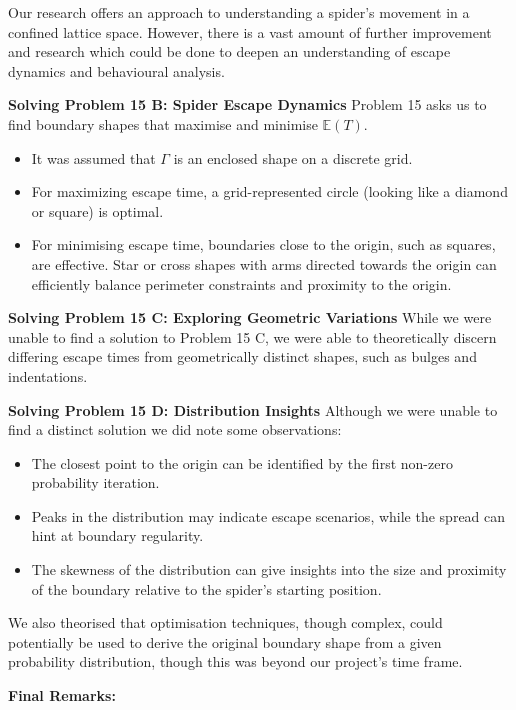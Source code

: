 \documentclass[12pt,a4paper]{article}
\begin{document}
Our research offers an approach to understanding a spider's movement in a confined lattice space. However, there is a vast amount of further improvement and research which could be done to deepen an understanding of escape dynamics and behavioural analysis.

\textbf{Solving Problem 15 B: Spider Escape Dynamics}
Problem 15 asks us to find boundary shapes that maximise and minimise $\mathbb{E}(T)$. 

\begin{itemize}
    \item It was assumed that \(\Gamma\) is an enclosed shape on a discrete grid.
    \item For maximizing escape time, a grid-represented circle (looking like a diamond or square) is optimal.
    \item For minimising escape time, boundaries close to the origin, such as squares, are effective. Star or cross shapes with arms directed towards the origin can efficiently balance perimeter constraints and proximity to the origin.
\end{itemize}

\textbf{Solving Problem 15 C: Exploring Geometric Variations}
While we were unable to find a solution to Problem 15 C, we were able to theoretically discern differing escape times from geometrically distinct shapes, such as bulges and indentations.

\textbf{Solving Problem 15 D: Distribution Insights}
Although we were unable to find a distinct solution we did note some observations:

\begin{itemize}
    \item The closest point to the origin can be identified by the first non-zero probability iteration.
    \item Peaks in the distribution may indicate escape scenarios, while the spread can hint at boundary regularity.
    \item The skewness of the distribution can give insights into the size and proximity of the boundary relative to the spider's starting position.
\end{itemize}

We also theorised that optimisation techniques, though complex, could potentially be used to derive the original boundary shape from a given probability distribution, though this was beyond our project's time frame.

\textbf{Final Remarks:}
\end{document}
